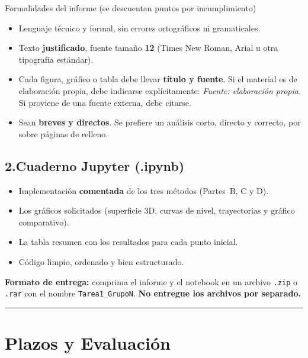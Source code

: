 \documentclass[12pt,a4paper]{article}
\begin{document}
\begin{ayuda}{Formalidades del informe (se descuentan puntos por incumplimiento)}
\begin{itemize}[topsep=2pt]
    \item Lenguaje técnico y formal, sin errores ortográficos ni gramaticales.
    \item Texto \textbf{justificado}, fuente tamaño \textbf{12}
          (Times New Roman, Arial u otra tipografía estándar).
    \item Cada figura, gráfico o tabla debe llevar \textbf{título y fuente}.
          Si el material es de elaboración propia, debe indicarse
          explícitamente: \emph{Fuente: elaboración propia}. Si proviene de una
          fuente externa, debe citarse.
    \item Sean \textbf{breves y directos}. Se prefiere un análisis corto,
          directo y correcto, por sobre páginas de relleno.
\end{itemize}
\end{ayuda}

\subsection*{2.\quad Cuaderno Jupyter (.ipynb)}

\begin{itemize}[topsep=2pt]
    \item Implementación \textbf{comentada} de los tres métodos
          (Partes~B, C y D).
    \item Los gráficos solicitados (superficie 3D, curvas de nivel,
          trayectorias y gráfico comparativo).
    \item La tabla resumen con los resultados para cada punto inicial.
    \item Código limpio, ordenado y bien estructurado.
\end{itemize}

\medskip
\noindent\textbf{Formato de entrega:} comprima el informe y el notebook en un
archivo \texttt{.zip} o \texttt{.rar} con el nombre \texttt{Tarea1\_GrupoN}.
\textbf{No entregue los archivos por separado.}

\noindent\rule{\linewidth}{0.4pt}

\section*{Plazos y Evaluación}
\end{document}
